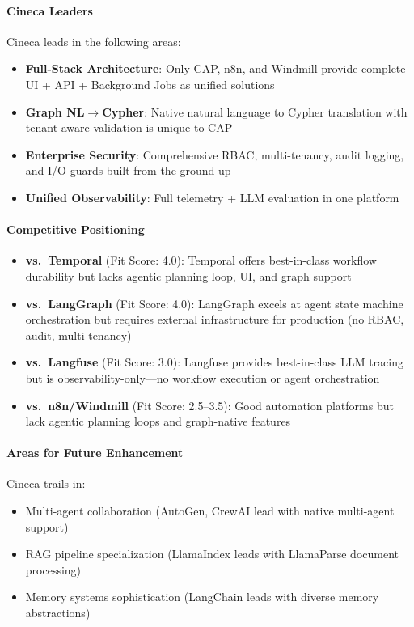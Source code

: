 \documentclass[a4paper,twoside]{sapthesis}
\begin{document}
\paragraph{Cineca Leaders}
Cineca leads in the following areas:
\begin{itemize}
    \item \textbf{Full-Stack Architecture}: Only CAP, n8n, and Windmill provide complete UI + API + Background Jobs as unified solutions
    \item \textbf{Graph NL$\rightarrow$Cypher}: Native natural language to Cypher translation with tenant-aware validation is unique to CAP
    \item \textbf{Enterprise Security}: Comprehensive RBAC, multi-tenancy, audit logging, and I/O guards built from the ground up
    \item \textbf{Unified Observability}: Full telemetry + LLM evaluation in one platform
\end{itemize}

\paragraph{Competitive Positioning}
\begin{itemize}
    \item \textbf{vs.\ Temporal} (Fit Score: 4.0): Temporal offers best-in-class workflow durability but lacks agentic planning loop, UI, and graph support
    \item \textbf{vs.\ LangGraph} (Fit Score: 4.0): LangGraph excels at agent state machine orchestration but requires external infrastructure for production (no RBAC, audit, multi-tenancy)
    \item \textbf{vs.\ Langfuse} (Fit Score: 3.0): Langfuse provides best-in-class LLM tracing but is observability-only---no workflow execution or agent orchestration
    \item \textbf{vs.\ n8n/Windmill} (Fit Score: 2.5--3.5): Good automation platforms but lack agentic planning loops and graph-native features
\end{itemize}

\paragraph{Areas for Future Enhancement}
Cineca trails in:
\begin{itemize}
    \item Multi-agent collaboration (AutoGen, CrewAI lead with native multi-agent support)
    \item RAG pipeline specialization (LlamaIndex leads with LlamaParse document processing)
    \item Memory systems sophistication (LangChain leads with diverse memory abstractions)
\end{itemize}
\end{document}
